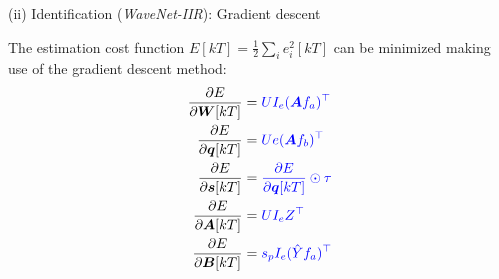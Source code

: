 \documentclass{beamer}
\begin{document}











\begin{frame}{(ii) Identification (\textit{WaveNet-IIR}): Gradient descent}

The estimation cost function $E[kT] = \frac{1}{2} \sum_{i} e_i^2[kT]$ can be minimized making use of the gradient descent method: %
\begin{align}
\frac{\partial E}{\partial \bm {W}[kT]} &=  \textcolor{blue}{UI_e(\bm {A}f_a)^\top} \\
\frac{\partial E}{\partial \bm {q}[kT]} &=  \textcolor{blue}{Ue(\bm {A}f_b)^\top} \\
\frac{\partial E}{\partial \bm {s}[kT]} &=  \textcolor{blue}{\frac{\partial E}{\partial \bm {q}[kT]} \odot  \tau} \\
\frac{\partial E}{\partial \bm {A}[kT]} &=  \textcolor{blue}{UI_eZ^\top} \\
\frac{\partial E}{\partial \bm {B}[kT]} &= \textcolor{blue}{s_pI_e(\hat{Y}f_a)^\top}
\end{align}
\end{frame}
\end{document}
